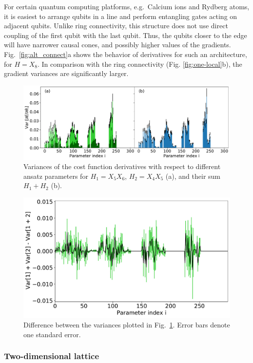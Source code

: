 For certain quantum computing platforms, e.g.~Calcium ions and Rydberg atoms, it is easiest to arrange qubits in a line and perform entangling gates acting on adjacent qubits. Unlike ring connectivity, this structure does not use direct coupling of the first qubit with the last qubit. Thus, the qubits closer to the edge will have narrower causal cones, and possibly higher values of the gradients. Fig.~\ref{fig:alt_connect}a shows the behavior of derivatives for such an architecture, for $H = X_8$. In comparison with the ring connectivity (Fig. \ref{fig:one-local}b), the gradient variances are significantly larger.

\begin{figure}
    \centering
    \includegraphics[width=\linewidth]{figures/sums_comparison_separate.pdf}
    \caption{Variances of the cost function derivatives with respect to different ansatz parameters for $H_1 = X_5 X_6$, $H_2 = X_4 X_5$ (a), and their sum $H_1 + H_2$ (b).}
    \label{fig:additive}
\end{figure}

\begin{figure}
    \centering
    \includegraphics[width=0.7\linewidth]{figures/sums_comparison_difference.pdf}
    \caption{Difference between the variances plotted in Fig.~\ref{fig:additive}. Error bars denote one standard error.}
    \label{fig:additive_delta}
\end{figure}


\subsubsection{Two-dimensional lattice}

